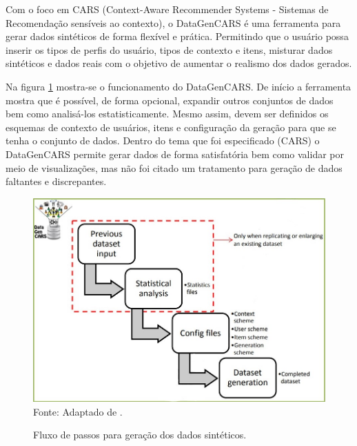 \documentclass[
	12pt,				%
	openright,			%
	oneside,			%
	a4paper,			%
	english,			%
	brazil				%
	]{abntex2}
\begin{document}
		Com o foco em CARS (Context-Aware Recommender Systems - Sistemas de Recomendação sensíveis ao contexto), o DataGenCARS \cite{delCarmenRodrguezHernndez2017} é uma ferramenta para gerar dados sintéticos de forma flexível e prática.
		Permitindo que o usuário possa inserir os tipos de perfis do usuário, tipos de contexto e itens, misturar dados sintéticos e dados reais com o objetivo de aumentar o realismo dos dados gerados.
		\par
		Na figura \ref{fig:DataGenCARS} mostra-se o funcionamento do DataGenCARS.
		De início a ferramenta mostra que é possível, de forma opcional, expandir outros conjuntos de dados bem como analisá-los estatisticamente.
		Mesmo assim, devem ser definidos os esquemas de contexto de usuários, itens e configuração da geração para que se tenha o conjunto de dados.
		Dentro do tema que foi especificado (CARS) o DataGenCARS permite gerar dados de forma satisfatória bem como validar por meio de visualizações, mas não foi citado um tratamento para geração de dados faltantes e discrepantes.
		\par
		\begin{figure}[h!]
			\centering
			\caption{Fluxo de passos para geração dos dados sintéticos.}
			\includegraphics[width=\linewidth]{./figures/TrabalhosRelacionados/DataGenCARS.jpg}
			\label{fig:DataGenCARS}
			\footnotesize Fonte: Adaptado de \cite{delCarmenRodrguezHernndez2017}.
		\end{figure}
\end{document}
